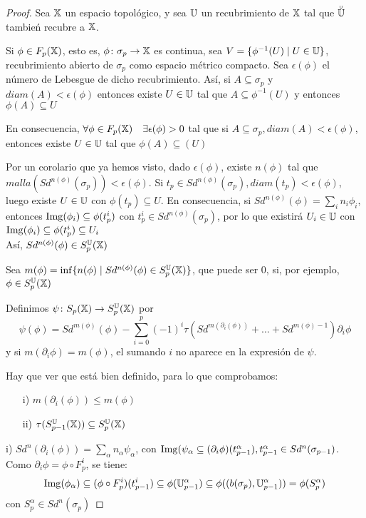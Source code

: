 \begin{proof}
  Sea ${\mathbb X}$ un espacio topológico, y sea ${\mathbb U}$ un recubrimiento de ${\mathbb X}$ tal que $\interior{\U}$ tambień recubre a ${\mathbb X}$.

  Si $\phi \in F_p({\mathbb X})$, esto es, $\phi \colon \sigma_p \to {\mathbb X}$ es continua, sea $V = \{\phi^{-1}(U) \mid U \in {\mathbb U}\}$, recubrimiento
  abierto de $\sigma_p$ como espacio métrico compacto. Sea $\epsilon(\phi)$ el número de Lebesgue de dicho recubrimiento.
  Así, si $A \subseteq \sigma_p$ y $diam(A) < \epsilon(\phi)$ entonces existe $U \in {\mathbb U}$ tal que $A \subseteq \phi^{-1}(U)$ y entonces
  $\phi(A) \subseteq U$

  En consecuencia, $\forall \phi \in F_p({\mathbb X}) \quad \exists \epsilon(\phi) > 0$ tal que si $A \subseteq \sigma_p, diam(A) < \epsilon(\phi)$,
  entonces existe $U \in {\mathbb U}$ tal que $\phi(A) \subseteq(U)$

  Por un corolario que ya hemos visto, dado $\epsilon(\phi)$, existe $n(\phi)$ tal que \\
  ${malla(Sd^{n(\phi)}(\sigma_p)) < \epsilon(\phi)}$. Si $t_p \in Sd^{n(\phi)}(\sigma_p), diam(t_p) < \epsilon(\phi)$,
  luego existe $U \in {\mathbb U}$ con $\phi(t_p) \subseteq U$. En consecuencia, si $Sd^{n(\phi)}(\phi) = \sum_i n_i \phi_i$,
  entonces $\operatorname{Img}(\phi_i) \subseteq \phi(t_p^i)$ con $t_p^i \in Sd^{n(\phi)}(\sigma_p)$,
  por lo que existirá $U_i \in {\mathbb U}$ con $\operatorname{Img}(\phi_i) \subseteq \phi(t_p^i) \subseteq U_i$ \\
  Así, $Sd^{n(\phi)}(\phi) \in S_p^{\mathbb U}({\mathbb X})$

  Sea $m(\phi) = \inf\{n(\phi) \mid Sd^{n(\phi)}(\phi) \in S_p^{\mathbb U}({\mathbb X})\}$, que puede ser $0$, si, por ejemplo, $\phi \in S_p^{\mathbb U}({\mathbb X})$

  Definimos $\psi \colon S_p({\mathbb X}) \to S_p^{\mathbb U}({\mathbb X})$ por
  \[\psi(\phi) = Sd^{m(\phi)}(\phi) - \sum\limits_{i = 0}^p (-1)^i \tau(Sd^{m(\partial_i(\phi))} + \dots + Sd^{m(\phi) - 1}) \partial_i \phi \]
  y si $m(\partial_i \phi) = m (\phi)$, el sumando $i$ no aparece en la expresión de $\psi$.

  Hay que ver que está bien definido, para lo que comprobamos:
  \begin{itemize}
    \item[i)] $m(\partial_i(\phi)) \leq m(\phi)$
    \item[ii)] $\tau(S_{p-1}^{\mathbb U}({\mathbb X})) \subseteq S_p^{\mathbb U}({\mathbb X})$
  \end{itemize}

  i) $Sd^n(\partial_i(\phi)) = \sum_\alpha n_\alpha \psi_\alpha$, con $\operatorname{Img}(\psi_\alpha \subseteq (\partial_i \phi)(t_{p-1}^\alpha), t_{p-1}^\alpha \in Sd^n(\sigma_{p-1})$. \\
  Como $\partial_i \phi = \phi \circ F_p^i$, se tiene:
  \[ \operatorname{Img}(\phi_\alpha) \subseteq (\phi \circ F_p^i)(t_{p-1}^i) \subseteq \phi({\mathbb U}_{p-1}^\alpha) \subseteq \phi((b(\sigma_p), {\mathbb U}_ {p-1}^\alpha)) = \phi(S_p^\alpha)\]
  con $S_p^\alpha \in Sd^n(\sigma_p)$


\end{proof}
